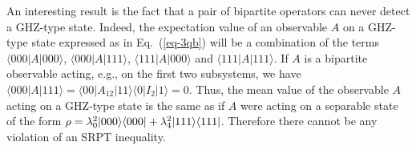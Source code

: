 An interesting result is the fact that a pair of bipartite operators can never detect a GHZ-type state. Indeed, the expectation value of an observable $A$ on a GHZ-type state expressed as in Eq.~(\ref{eq-3qb}) will be a combination of the terms $\langle 000 |A| 000\rangle$, $\langle 000 |A| 111\rangle$, $\langle 111 |A| 000\rangle$ and $\langle 111 |A| 111\rangle$. If $A$ is a bipartite observable acting, e.g., on the first two subsystems, we have $\langle 000 |A| 111\rangle = \langle 00 |A_{12}| 11\rangle  \langle 0|I_2|1\rangle = 0$. Thus, the mean value of the observable $A$ acting on a GHZ-type state is the same as if $A$ were acting on a separable state of the form $\rho=\lambda_0^2 | 000 \rangle \langle 000 | + \lambda_4^2 | 111 \rangle \langle 111 |$. Therefore there cannot be any violation of an SRPT inequality.

%


